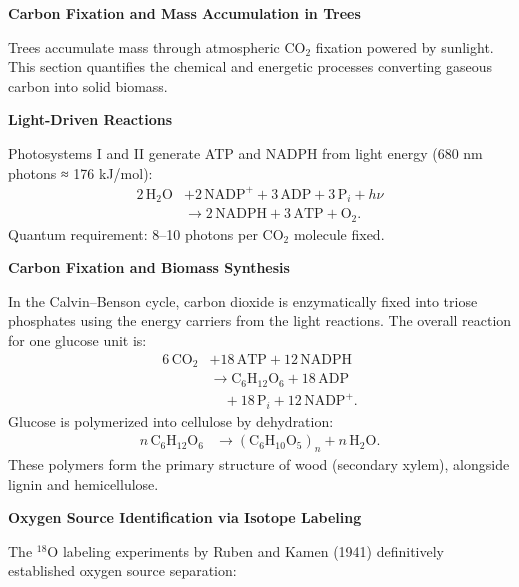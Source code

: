 \begin{technical}
{\Large\textbf{Carbon Fixation and Mass Accumulation in Trees}}

\vspace{0.3em}
\noindent Trees accumulate mass through atmospheric $\mathrm{CO}_2$ fixation powered by sunlight. This section quantifies the chemical and energetic processes converting gaseous carbon into solid biomass.

\vspace{0.5em}
\noindent\textbf{Light-Driven Reactions}

\vspace{0.2em}
\noindent Photosystems I and II generate ATP and NADPH from light energy (680 nm photons ≈ 176 kJ/mol):
\begin{align}
2\,\mathrm{H}_2\mathrm{O} 
&+ 2\,\mathrm{NADP}^+ 
+ 3\,\mathrm{ADP} 
+ 3\,\mathrm{P}_i 
+ h\nu \nonumber \\
&\rightarrow 2\,\mathrm{NADPH} 
+ 3\,\mathrm{ATP} 
+ \mathrm{O}_2.
\end{align}
Quantum requirement: 8–10 photons per $\mathrm{CO}_2$ molecule fixed.

\vspace{0.5em}
\noindent\textbf{Carbon Fixation and Biomass Synthesis}

\vspace{0.2em}
\noindent In the Calvin–Benson cycle, carbon dioxide is enzymatically fixed into triose phosphates using the energy carriers from the light reactions. The overall reaction for one glucose unit is:
\begin{align}
6\,\mathrm{CO}_2 
&+ 18\,\mathrm{ATP} 
+ 12\,\mathrm{NADPH} \nonumber \\
&\rightarrow \mathrm{C}_6\mathrm{H}_{12}\mathrm{O}_6 
+ 18\,\mathrm{ADP} \nonumber \\
&\quad + 18\,\mathrm{P}_i 
+ 12\,\mathrm{NADP}^+.
\end{align}
Glucose is polymerized into cellulose by dehydration:
\begin{align}
n\,\mathrm{C}_6\mathrm{H}_{12}\mathrm{O}_6 
&\rightarrow (\mathrm{C}_6\mathrm{H}_{10}\mathrm{O}_5)_n 
+ n\,\mathrm{H}_2\mathrm{O}.
\end{align}
These polymers form the primary structure of wood (secondary xylem), alongside lignin and hemicellulose.

\vspace{0.5em}
\noindent\textbf{Oxygen Source Identification via Isotope Labeling}

\vspace{0.2em}
\noindent The $^{18}\mathrm{O}$ labeling experiments by Ruben and Kamen (1941) definitively established oxygen source separation:


\end{technical}
